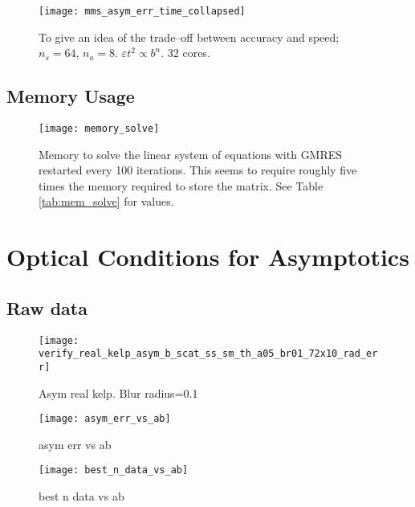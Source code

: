 \begin{figure}[H]
  \centering
  \texttt{[image: mms\_asym\_err\_time\_collapsed]}
  \caption{To give an idea of the trade--off between accuracy and speed; $n_s=64$, $n_a=8$. $\varepsilon t^2 \propto b^n$. 32 cores.}
  \label{fig:mms_asym_err_time_collapsed}
\end{figure}

\subsection{Memory Usage}
\begin{figure}[H]
  \centering
  \texttt{[image: memory\_solve]}
  \caption{Memory to solve the linear system of equations with GMRES restarted every 100 iterations. This seems to require roughly five times the memory required to store the matrix. See Table \ref{tab:mem_solve} for values.}
  \label{fig:memory_solve}
\end{figure}

\section{Optical Conditions for Asymptotics}

\subsection{Raw data}

\newcommand\rdfigwidth{4.5in}

\begin{figure}[H]
  \centering
  \texttt{[image: verify\_real\_kelp\_asym\_b\_scat\_ss\_sm\_th\_a05\_br01\_72x10\_rad\_err]}
  \caption{Asym real kelp. Blur radius=0.1}
  \label{fig:asym_real_kelp_br01}
\end{figure}

\begin{figure}[H]
  \centering
  \texttt{[image: asym\_err\_vs\_ab]}
  \caption{asym err vs ab}
  \label{fig:asym_err_vs_ab}
\end{figure}

\begin{figure}[H]
  \centering
  \texttt{[image: best\_n\_data\_vs\_ab]}
  \caption{best n data vs ab}
  \label{fig:best_n_data_vs_ab}
\end{figure}

